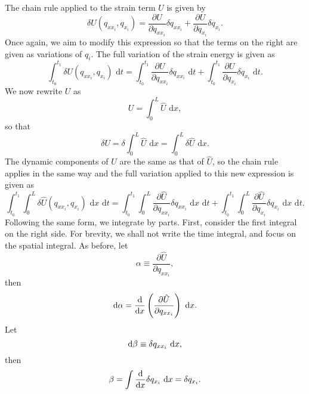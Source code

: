 The chain rule applied to the strain term $U$ is given by
\begin{equation}
\delta U(q_{xx_i},q_{x_i}) = \frac{\partial U}{\partial q_{xx_i}}\delta q_{xx_i}+\frac{\partial U}{\partial q_{x_i}}\delta q_{x_i}.
\end{equation}
Once again, we aim to modify this expression so that the terms on the right are given as variations of $q_i$.
The full variation of the strain energy is given as
\begin{equation}
\int_{t_0}^{t_1}\delta U(q_{xx_i},q_{x_i})\text{ d}t = \int_{t_0}^{t_1}\frac{\partial U}{\partial q_{xx_i}}\delta q_{xx_i}\text{ d}t+\int_{t_0}^{t_1}\frac{\partial U}{\partial q_{x_i}}\delta q_{x_i}\text{ d}t.
\end{equation}
We now rewrite $U$ as
\begin{equation}
U = \int_0^L \hat{U}\text{ d}x,
\end{equation}
so that
\begin{equation}
\delta U = \delta \int_0^L\hat{U}\text{ d}x = \int_0^L\delta\hat{U}\text{ d}x.
\end{equation}
The dynamic components of $U$ are the same as that of $\hat{U}$, so the chain rule applies in the same way and the full variation applied to this new expression is given as
\begin{equation}
\int_{t_0}^{t_1}\int_0^L\delta \hat U(q_{xx_i},q_{x_i})\text{ d}x\text{ d}t = \int_{t_0}^{t_1}\int_0^L\frac{\partial \hat U}{\partial q_{xx_i}}\delta q_{xx_i}\text{ d}x\text{ d}t+\int_{t_0}^{t_1}\int_0^L\frac{\partial \hat U}{\partial q_{x_i}}\delta q_{x_i}\text{ d}x\text{ d}t.
\label{eq:strain.byparts.initial}
\end{equation}
Following the same form, we integrate by parts. First, consider the first integral on the right side. For brevity, we shall not write the time integral, and focus on the spatial integral. As before, let
\begin{equation}
\alpha \equiv \frac{\partial \hat U}{\partial q_{xx_i}},
\end{equation}
then
\begin{equation}
\text d\alpha = \frac{\text d}{\text dx}\left(\frac{\partial \hat{U}}{\partial q_{xx_i}}\right)\text{ d}x.
\end{equation}
Let
\begin{equation}
\text d\beta \equiv \delta q_{xx_i}\text{ d}x,
\end{equation}
then 
\begin{equation}
\beta = \int \frac{\text d}{\text dx}\delta q_{x_i}\text{ d}x = \delta q_{x_i}.
\end{equation}
